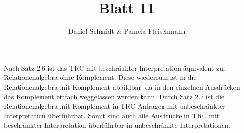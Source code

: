 \documentclass[12pt,a4paper]{amsart}
\begin{document}
\title{Blatt 11}

\author{Daniel Schmidt \& Pamela Fleischmann}

\maketitle


\begin{aufgabe1}
Nach Satz 2.6 ist das TRC mit beschränkter Interpretation äquivalent zur Relationenalgebra ohne Komplement. Diese wiederrum ist in die Relationenalgebra mit Komplement abbildbar, da in den einzelnen Ausdrücken das Komplement einfach weggelassen werden kann. Durch Satz 2.7 ist die Relationenalgebra mit Komplement in TRC-Anfragen mit unbeschränkter Interpretation überführbar. Somit sind auch alle Ausdrücke in TRC mit beschränkter Interpretation überführbar in unbeschränkte Interpretationen.
\end{aufgabe1}
\end{document}
